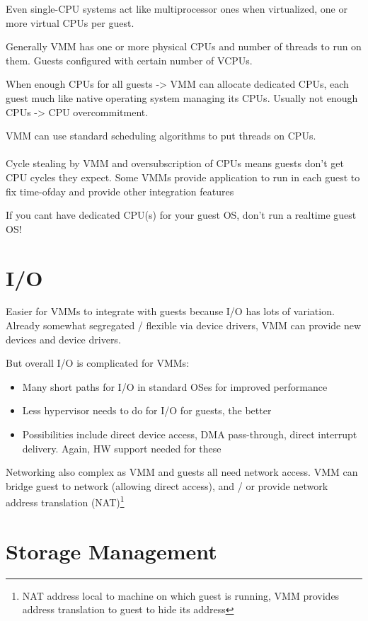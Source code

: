 Even single-CPU systems act like multiprocessor ones when
virtualized, one or more virtual CPUs per guest.

Generally VMM has one or more physical CPUs and number of
threads to run on them. Guests configured with certain number of VCPUs.

When enough CPUs for all guests -> VMM can allocate dedicated
CPUs, each guest much like native operating system managing its
CPUs. Usually not enough CPUs -> CPU overcommitment.

VMM can use standard scheduling algorithms to put threads on
CPUs.

\paragraph{}
Cycle stealing by VMM and oversubscription of CPUs means guests
don’t get CPU cycles they expect. Some VMMs provide application to run in each guest to fix time-ofday and provide other integration features

If you cant have dedicated CPU(s) for your guest OS, don’t run a realtime guest OS!

\section{I/O}
Easier for VMMs to integrate with guests because I/O has lots of
variation. Already somewhat segregated / flexible via device drivers, VMM can provide new devices and device drivers.


But overall I/O is complicated for VMMs:

\begin{itemize}
    \item Many short paths for I/O in standard OSes for improved performance
    \item Less hypervisor needs to do for I/O for guests, the better
    \item Possibilities include direct device access, DMA pass-through, direct interrupt delivery. Again, HW support needed for these
\end{itemize}

Networking also complex as VMM and guests all need network access. VMM can bridge guest to network (allowing direct access), and / or provide network address translation (NAT)\footnote{NAT address local to machine on which guest is running, VMM
provides address translation to guest to hide its address}


\section{Storage Management}

